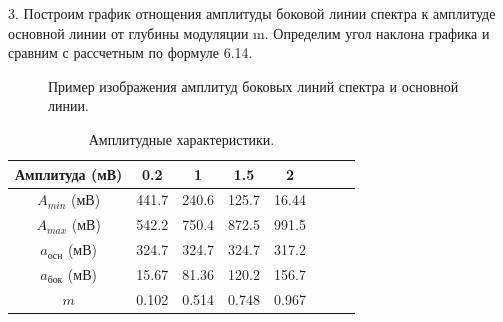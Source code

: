 \documentclass[a4paper,12pt]{article} %
\begin{document}
3. Построим график отнощения амплитуды боковой линии спектра к амплитуде основной линии от глубины модуляции m. Определим угол наклона графика и сравним с рассчетным по формуле 6.14.

\begin{figure}[H]\label{pic10}
 	\caption{Пример изображения амплитуд боковых линий спектра и основной линии.}
\end{figure}

\begin{table}[H]
\caption{\label{tab:canonsummary} Амплитудные характеристики.}
\begin{center}
\begin{tabular}{|c|c|c|c|c|c|c|c|}
\hline
Амплитуда (мВ) & 0.2 & 1 & 1.5 & 2\\
\hline
$A_{min}$ (мВ) & 441.7 & 240.6 & 125.7 & 16.44\\
\hline
$A_{max}$ (мВ) & 542.2 & 750.4 & 872.5 & 991.5\\
\hline
$a_\text{осн}$ (мВ) & 324.7 & 324.7 & 324.7 & 317.2\\
\hline
$a_\text{бок}$ (мВ) & 15.67 & 81.36 & 120.2 & 156.7\\
\hline
$m$ & 0.102 & 0.514 & 0.748 & 0.967\\
\hline
\end{tabular}
\end{center}
\label{table1:ref}
\end{table}
\end{document}
